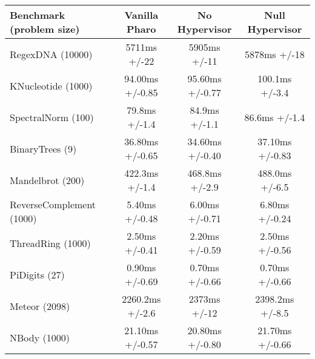\begin{table}[ht]

 	\centering
 	\begin{tabular}{lccc}%
			\toprule
			\textbf{Benchmark (problem size)}
 			& \textbf{Vanilla Pharo \VM}
			& \textbf{No Hypervisor}
			& \textbf{Null Hypervisor}\\
			
		\midrule
		RegexDNA (10000) & 5711ms +/-22 & 5905ms +/-11 & 5878ms +/-18 \\\midrule%
		KNucleotide (1000)& 94.00ms +/-0.85 & 95.60ms +/-0.77 & 100.1ms +/-3.4\\\midrule%
		SpectralNorm (100) & 79.8ms +/-1.4 & 84.9ms +/-1.1 & 86.6ms +/-1.4\\\midrule%
		BinaryTrees (9) & 36.80ms +/-0.65 & 34.60ms +/-0.40 & 37.10ms +/-0.83 \\\midrule%
		Mandelbrot (200) & 422.3ms +/-1.4 & 468.8ms +/-2.9 & 488.0ms +/-6.5 \\\midrule%
		ReverseComplement (1000) & 5.40ms +/-0.48 & 6.00ms +/-0.71 & 6.80ms +/-0.24 \\\midrule%
		ThreadRing (1000) & 2.50ms +/-0.41 & 2.20ms +/-0.59 & 2.50ms +/-0.56\\\midrule%
		PiDigits (27) & 0.90ms +/-0.69 & 0.70ms +/-0.66 & 0.70ms +/-0.66 \\\midrule%
		Meteor (2098) & 2260.2ms +/-2.6 & 2373ms +/-12 & 2398.2ms +/-8.5 \\\midrule%
		NBody (1000) & 21.10ms +/-0.57 & 20.80ms +/-0.80 & 21.70ms +/-0.66 \\\midrule%

\end{tabular}
\end{table}
